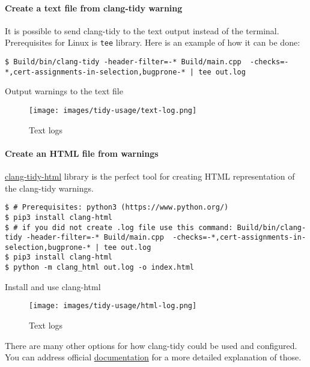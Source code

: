 \paragraph{Create a text file from clang-tidy warning \\}

It is possible to send clang-tidy to the text output instead of the terminal. Prerequisites for Linux is \lstinline{tee} library. Here is an example of how it can be done:
\begin{listing}[h]
\begin{verbatim}
$ Build/bin/clang-tidy -header-filter=-* Build/main.cpp  -checks=-*,cert-assignments-in-selection,bugprone-* | tee out.log
\end{verbatim}
\caption{Output warnings to the text file}
\label{code:out-text}
\end{listing}

\begin{figure}[H]
    \centering
    \texttt{[image: images/tidy-usage/text-log.png]}
    \label{fig:clang-tidy-usage-03}
    \caption{Text logs}
\end{figure}

\paragraph{Create an HTML file from warnings}

\href{https://github.com/austinbhale/clang-tidy-html}{clang-tidy-html} library is the perfect tool for creating HTML representation of the clang-tidy warnings. 

\begin{listing}[h]
\begin{verbatim}
$ # Prerequisites: python3 (https://www.python.org/)
$ pip3 install clang-html
$ # if you did not create .log file use this command: Build/bin/clang-tidy -header-filter=-* Build/main.cpp  -checks=-*,cert-assignments-in-selection,bugprone-* | tee out.log
$ pip3 install clang-html
$ python -m clang_html out.log -o index.html
\end{verbatim}
\caption{Install and use clang-html}
\label{code:out-html}
\end{listing}


\begin{figure}[H]
    \centering
    \caption{Text logs}
    \texttt{[image: images/tidy-usage/html-log.png]}
    \label{fig:clang-tidy-usage-04}
\end{figure}

There are many other options for how clang-tidy could be used and configured. You can address official \href{https://clang.llvm.org/extra/clang-tidy/index.html}{documentation} for a more detailed explanation of those.